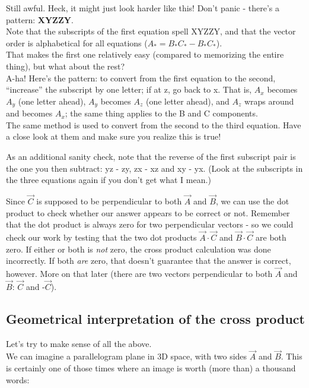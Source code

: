 \documentclass[8.01x]{subfiles}
\begin{document}
Still awful. Heck, it might just look harder like this! Don't panic - there's a pattern: {\bf XYZZY}.\\
Note that the subscripts of the first equation spell XYZZY, and that the vector order is alphabetical for all equations ($A_* = B_* C_* - B_* C_*$).\\
That makes the first one relatively easy (compared to memorizing the entire thing), but what about the rest?\\
A-ha! Here's the pattern: to convert from the first equation to the second, ``increase'' the subscript by one letter; if at z, go back to x. That is, $A_x$ becomes $A_y$ (one letter ahead), $A_y$ becomes $A_z$ (one letter ahead), and $A_z$ wraps around and becomes $A_x$; the same thing applies to the B and C components.\\
The same method is used to convert from the second to the third equation. Have a close look at them and make sure you realize this is true!

As an additional sanity check, note that the reverse of the first subscript pair is the one you then subtract: yz - zy, zx - xz and xy - yx. (Look at the subscripts in the three equations again if you don't get what I mean.)

Since $\vec{C}$ is supposed to be perpendicular to both $\vec{A}$ and $\vec{B}$, we can use the dot product to check whether our answer appears to be correct or not. Remember that the dot product is always zero for two perpendicular vectors - so we could check our work by testing that the two dot products $\vec{A} \cdot \vec{C}$ and $\vec{B} \cdot \vec{C}$ are both zero. If either or both is \emph{not} zero, the cross product calculation was done incorrectly. If both \emph{are} zero, that doesn't guarantee that the answer is correct, however. More on that later (there are two vectors perpendicular to both $\vec{A}$ and $\vec{B}$: $\vec{C}$ and -$\vec{C}$).

\subsection{Geometrical interpretation of the cross product}
Let's try to make sense of all the above.\\
We can imagine a parallelogram plane in 3D space, with two sides $\vec{A}$ and $\vec{B}$. This is certainly one of those times where an image is worth (more than) a thousand words:
\end{document}
